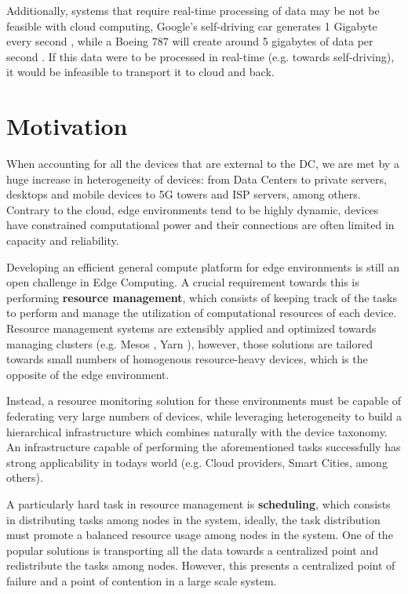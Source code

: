 Additionally, systems that require real-time processing of data may be not be feasible with cloud computing, Google's self-driving car generates 1 Gigabyte every second \cite{datafloq}, while a Boeing 787 will create around 5 gigabytes of data per second \cite{finnegan_2013}. If this data were to be processed in real-time (e.g. towards self-driving), it would be infeasible to transport it to cloud and back. 

\section{Motivation}

When accounting for all the devices that are external to the DC, we are met by a huge increase in heterogeneity of devices: from Data Centers to private servers, desktops and mobile devices to 5G towers and ISP servers, among others. Contrary to the cloud, edge environments tend to be highly dynamic, devices have constrained computational power and their connections are often limited in capacity and reliability. 

Developing an efficient general compute platform for edge environments is still an open challenge in Edge Computing. A crucial requirement towards this is performing \textbf{resource management}, which consists of keeping track of the tasks to perform and manage the utilization of computational resources of each device. Resource management systems are extensibly applied and optimized towards managing clusters (e.g. Mesos \cite{hindman2011mesos}, Yarn \cite{Vavilapalli2013ApacheHY}), however, those solutions are tailored towards small numbers of homogenous resource-heavy devices, which is the opposite of the edge environment.

Instead, a resource monitoring solution for these environments must be capable of federating very large numbers of devices, while leveraging heterogeneity to build a hierarchical infrastructure which combines naturally with the device taxonomy. An infrastructure capable of performing the aforementioned tasks successfully has strong applicability in todays world (e.g. Cloud providers, Smart Cities, among others). 

A particularly hard task in resource management is \textbf{scheduling}, which consists in distributing tasks among nodes in the system, ideally, the task distribution must promote a balanced resource usage among nodes in the system. One of the popular solutions is transporting all the data towards a centralized point and redistribute the tasks among nodes. However, this presents a centralized point of failure and a point of contention in a large scale system. 

